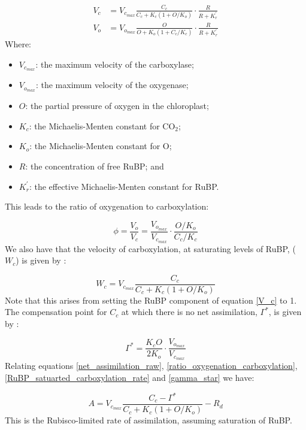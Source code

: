 \documentclass[11pt]{article} %
\begin{document}
\begin{align} \label{V_c}
V_c &= V_{c_{max}}\frac{C_c}{C_c+K_c\left(1 + O/K_o\right)}\cdot\frac{R}{R + K^\prime_r} \\
V_o &= V_{o_{max}}\frac{O}{O+K_o\left(1 + C_c/K_c\right)}\cdot\frac{R}{R + K^\prime_r}
\end{align}
Where:
\begin{itemize}
 \item $V_{c_{max}}$: the maximum velocity of the carboxylase;
 \item $V_{o_{max}}$: the maximum velocity of the oxygenase;
 \item $O$: the partial pressure of oxygen in the chloroplast;
 \item $K_c$: the Michaelis-Menten constant for CO$_2$;
 \item $K_o$: the Michaelis-Menten constant for O;
 \item $R$: the concentration of free RuBP; and
 \item $K^\prime_r$: the effective Michaelis-Menten constant for RuBP.
\end{itemize}
This leads to the ratio of oxygenation to carboxylation:

\begin{equation} \label{ratio_oxygenation_carboxylation}
\phi = \frac{V_o}{V_c} = \frac{V_{o_{max}}}{V_{c_{max}}}\cdot\frac{O/K_o}{C_c/K_c}
\end{equation}
We also have that the velocity of carboxylation, at saturating levels of RuBP, ($W_c$) is given by \cite{GrantTestsimplebiochemical1989}:

\begin{equation} \label{RuBP_satuarted_carboxylation_rate}
W_c = V_{c_{max}} \frac{C_c}{C_c + K_c (1 + O / K_o)}
\end{equation}
Note that this arises from setting the RuBP component of equation \ref{V_c} to 1.
The compensation point for $C_c$ at which there is no net assimilation, $\Gamma^*$, is given by \cite{Farquharbiochemicalmodelphotosynthetic1980}:

\begin{equation} \label{gamma_star}
\Gamma^* = \frac{K_c O}{2 K_o}\cdot \frac{V_{o_{max}}}{V_{c_{max}}}
\end{equation}
Relating equations \ref{net_assimilation_raw}, \ref{ratio_oxygenation_carboxylation}, \ref{RuBP_satuarted_carboxylation_rate} and \ref{gamma_star} we have:

\begin{equation} \label{rubisco_limited_photosynthesis}
A = V_{c_{max}} \frac{C_c - \Gamma^*}{C_c+K_c(1+O/K_o)}-R_d
\end{equation}
This is the Rubisco-limited rate of assimilation, assuming saturation of RuBP.
\end{document}
